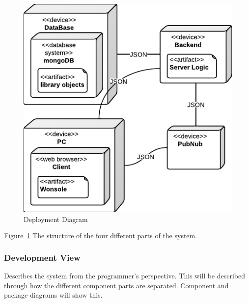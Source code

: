 \begin{figure}[h]
\centering
\includegraphics[width=5in]{image/architecture/s1/s1DeploymentDiagram.png}
\caption{Deployment Diagram}
\label{figure:s1DeploymentDiagram}
\end{figure}

Figure~\ref{figure:s1DeploymentDiagram} The structure of the four different parts of the system.

\subsubsection{Development View}
Describes the system from the programmer's perspective. This will be described through how the different component parts are separated. Component and package diagrams will show this.


